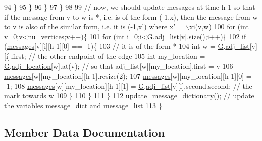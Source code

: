 \begin{DoxyCode}
94         \}
95       \}
96     \}
97   \}
98 
99   \textcolor{comment}{// now, we should update messages at time h-1 so that if the message from v to w is *, i.e. is of the
       form (-1,x), then the message from w to v is also of the similar form, i.e. it is (-1,x') where x' = \(\backslash\)xi(v,w)}
100   \textcolor{keywordflow}{for} (\textcolor{keywordtype}{int} v=0;v<nu\_vertices;v++)\{
101     \textcolor{keywordflow}{for} (\textcolor{keywordtype}{int} i=0;i<\hyperlink{classgraph__message_abffce6d6a7868da0e747425569759f0f}{G}.\hyperlink{classmarked__graph_a1a0bf7ca413a278763f7c878b3b6fd6f}{adj\_list}[v].size();i++)\{
102       \textcolor{keywordflow}{if} (\hyperlink{classgraph__message_a06a1d1ab91b4891c65ea80205566f800}{messages}[v][i][h-1][0] == -1)\{
103         \textcolor{comment}{// it is of the form *}
104         \textcolor{keywordtype}{int} w = \hyperlink{classgraph__message_abffce6d6a7868da0e747425569759f0f}{G}.\hyperlink{classmarked__graph_a1a0bf7ca413a278763f7c878b3b6fd6f}{adj\_list}[v][i].first; \textcolor{comment}{// the other endpoint of the edge}
105         \textcolor{keywordtype}{int} my\_location = \hyperlink{classgraph__message_abffce6d6a7868da0e747425569759f0f}{G}.\hyperlink{classmarked__graph_a3ae722ea9583ad23af34d789a88ac01a}{adj\_location}[w].at(v); \textcolor{comment}{// so that adj\_list[w][my\_location].first =
       v}
106         \hyperlink{classgraph__message_a06a1d1ab91b4891c65ea80205566f800}{messages}[w][my\_location][h-1].resize(2);
107         \hyperlink{classgraph__message_a06a1d1ab91b4891c65ea80205566f800}{messages}[w][my\_location][h-1][0] = -1;
108         \hyperlink{classgraph__message_a06a1d1ab91b4891c65ea80205566f800}{messages}[w][my\_location][h-1][1] = \hyperlink{classgraph__message_abffce6d6a7868da0e747425569759f0f}{G}.\hyperlink{classmarked__graph_a1a0bf7ca413a278763f7c878b3b6fd6f}{adj\_list}[v][i].second.second; \textcolor{comment}{// the mark
       towards w}
109       \}
110     \}
111   \}
112   \hyperlink{classgraph__message_aede1ecdcf72bac693d357241eddb20b0}{update\_message\_dictionary}(); \textcolor{comment}{// update the variables message\_dict and
       message\_list}
113 \}
\end{DoxyCode}


\subsection{Member Data Documentation}
\mbox{\label{classgraph__message_a45dfd061b7bc73572e5132fbf66efd55}} 
